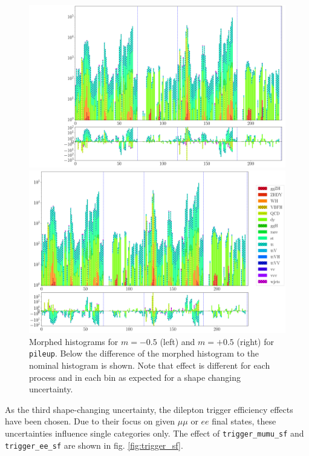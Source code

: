 \begin{figure}[h!]
	\centering
		\begin{minipage}{.5\textwidth}
				\centering
				\includegraphics[width=\linewidth]{figures/network_setup/pileup_-0.5}
			\end{minipage}%
		\begin{minipage}{.5\textwidth}
				\centering
				\includegraphics[width=\linewidth]{figures/network_setup/pileup_+0.5}
			\end{minipage}
	\caption{Morphed histograms for $m = -0.5$ (left) and $m = +0.5$ (right) for \texttt{pileup}. Below the difference of the morphed histogram to the nominal histogram is shown. Note that effect is different for each process and in each bin as expected for a shape changing uncertainty.}
	\label{fig:pileup}
\end{figure}

As the third shape-changing uncertainty, the dilepton trigger efficiency effects have been chosen. Due to their focus on given $\mu\mu$ or $ee$ final states, these uncertainties influence single categories only. The effect of \texttt{trigger\_mumu\_sf} and \texttt{trigger\_ee\_sf} are shown in fig. \ref{fig:trigger_sf}.

